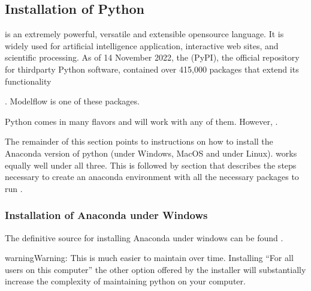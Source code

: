 \documentclass[letterpaper,10pt,english]{jupyterBook}
\begin{document}
\subsection{Installation of Python}
\label{\detokenize{content/03_Installation/InstallingPython:installation-of-python}}
\sphinxAtStartPar
{} is an extremely powerful, versatile and extensible open\sphinxhyphen{}source language. It is widely used for artificial intelligence application, interactive web sites, and scientific processing. As of 14 November 2022, the  (PyPI), the official repository for third\sphinxhyphen{}party Python software, contained over 415,000 packages that extend its functionality %
\begin{footnote}[1]\sphinxAtStartFootnote
{}
%
\end{footnote}. Modelflow is one of these packages.

\sphinxAtStartPar
Python comes in many flavors and  will work with any of them.  However, .

\sphinxAtStartPar
The remainder of this section points to instructions on how to install the Anaconda version of python (under Windows, MacOS and under Linux).  works equally well under all three. This is followed by section that describes the steps necessary to create an anaconda environment with all the necessary packages to run .


\subsubsection{Installation of Anaconda under Windows}
\label{\detokenize{content/03_Installation/InstallingPython:installation-of-anaconda-under-windows}}
\sphinxAtStartPar
The definitive source for installing Anaconda under windows can be found .

\begin{sphinxadmonition}{warning}{Warning:}
\sphinxAtStartPar
{}  This is much easier to maintain over time.  Installing “For all users on this computer” the other option offered by the  installer   will substantially increase the complexity of maintaining python on your computer.
\end{sphinxadmonition}
\end{document}
